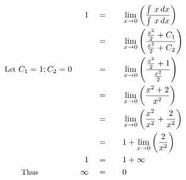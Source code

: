\begin{alignat*}{5}
&\,&1\quad&=\quad&&\lim_{x\to0}\left(\frac{\int\,x\,dx}{\int\,x\,dx}\right)\\
&\,&\,&=&&\lim_{x\to0}\left(\frac{\frac{x^2}{2}+C_1}{\frac{x^2}{2}+C_2}\right)\\
&\small\text{Let }C_1=1; C_2=0&\,&=&&\lim_{x\to0}\left(\frac{\frac{x^2}{2}+1}{\frac{x^2}{2}}\right)\\
&\,&\,&=&&\lim_{x\to0}\left({\frac{x^2+2}{x^2}}\right)\\
&\,&\,&=&&\lim_{x\to0}\left(\frac{x^2}{x^2}+\frac{2}{x^2}\right)\\
&\,&\,&=&&1+\lim_{x\to0}\left(\frac{2}{x^2}\right)\\
&\,&1\quad&=&&1+\infty\\
&\qquad\small\text{Thus}&\infty\quad&=&&0
\end{alignat*}
